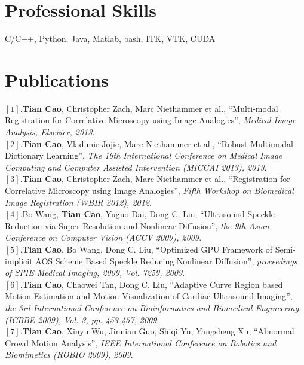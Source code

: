 \documentclass[line,margin]{res}
\begin{document}
\begin{resume}
\section{\sc Professional Skills}
\smallskip

C/C++, Python, Java, Matlab, bash, ITK, VTK, CUDA

\section{\sc Publications}  
\smallskip
$[1]$.\textbf{Tian Cao}, Christopher Zach, Marc Niethammer et al., ``Multi-modal Registration for Correlative Microscopy using Image Analogies'', \emph{Medical Image Analysis, Elsevier, 2013}. \vspace{.05in}\\
$[2]$.\textbf{Tian Cao}, Vladimir Jojic, Marc Niethammer et al., ``Robust Multimodal Dictionary Learning'', \emph{The 16th International Conference on Medical Image Computing and Computer Assisted Intervention (MICCAI 2013), 2013}. \vspace{.05in}\\ 
$[3]$.\textbf{Tian Cao}, Christopher Zach, Marc Niethammer et al., ``Registration for Correlative Microscopy using Image Analogies'',  \emph{Fifth Workshop on Biomedical Image Registration (WBIR 2012), 2012}. \vspace{.05in}\\%
$[4]$.Bo Wang, \textbf{Tian Cao}, Yuguo Dai, Dong C. Liu, ``Ultrasound Speckle Reduction via Super Resolution and Nonlinear Diffusion'',  \emph{the 9th Asian Conference on Computer Vision (ACCV 2009), 2009}. \vspace{.05in}\\
$[5]$.\textbf{Tian Cao}, Bo Wang, Dong C. Liu, ``Optimized GPU Framework of Semi-implicit AOS
Scheme Based Speckle Reducing Nonlinear Diﬀusion'',  \emph{proceedings of SPIE Medical Imaging, 2009, Vol. 7259, 2009}.\vspace{.05in}\\%
$[6]$.\textbf{Tian Cao}, Chaowei Tan, Dong C. Liu, ``Adaptive Curve Region based Motion Estimation and Motion Visualization of Cardiac Ultrasound Imaging'',  \emph{the 3rd International Conference on Bioinformatics and Biomedical Engineering (ICBBE 2009), Vol. 3, pp. 453-457, 2009}.\vspace{.05in}\\
$[7]$.\textbf{Tian Cao}, Xinyu Wu, Jinnian Guo, Shiqi Yu, Yangsheng Xu, ``Abnormal Crowd Motion Analysis'', \emph{IEEE International Conference on Robotics and Biomimetics (ROBIO 2009), 2009}.


\end{resume}
\end{document}
